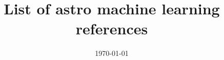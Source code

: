 \documentclass[11pt]{article}
\begin{document}
\title{List of astro machine learning references}

\date{\today}
\maketitle



\nocite{*}



\end{document}
